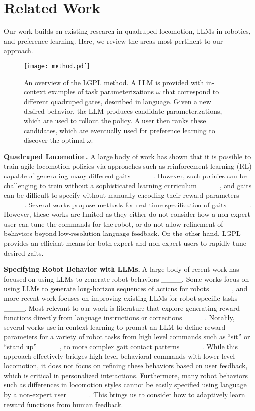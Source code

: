 \section{Related Work}
Our work builds on existing research in quadruped locomotion, LLMs in robotics, and preference learning. Here, we review the areas most pertinent to our approach.

\begin{figure*}[h]
  \centering
  \vspace{0.05in}
  \texttt{[image: method.pdf]}
  \caption{An overview of the LGPL method. A LLM is provided with in-context examples of task parameterizations $\omega$ that correspond to different quadruped gates, described in language. Given a new desired behavior, the LLM produces candidate parameterizations, which are used to rollout the policy. A user then ranks these candidates, which are eventually used for preference learning to discover the optimal $\omega$.}
  \label{fig:method}
  \vspace{-0.2in}
\end{figure*}

\noindent\textbf{Quadruped Locomotion.} A large body of work has shown that it is possible to train agile locomotion policies via approaches such as reinforcement learning (RL) capable of generating many different gaits ____. However, such policies can be challenging to train without a sophisticated learning curriculum ____, and gaits can be difficult to specify without manually encoding their reward parameters ____. Several works propose methods for real time specification of gaits ____. However, these works are limited as they either do not consider how a non-expert user can tune the commands for the robot, or do not allow refinement of behaviors beyond low-resolution language feedback. On the other hand, LGPL provides an efficient means for both expert and non-expert users to rapidly tune desired gaits.

\noindent\textbf{Specifying Robot Behavior with LLMs.} A large body of recent work has focused on using LLMs to generate robot behaviors ____. Some works focus on using LLMs to generate long-horizon sequences of actions for robots ____, and more recent work focuses on improving existing LLMs for robot-specific tasks ____. Most relevant to our work is literature that explore generating reward functions directly from language instructions or corrections ____. Notably, several works use in-context learning to prompt an LLM to define reward parameters for a variety of robot tasks from high level commands such as ``sit'' or ``stand up'' ____, to more complex gait contact patterns ____. 
While this approach effectively bridges high-level behavioral commands with lower-level locomotion, it does not focus on refining these behaviors based on user feedback, which is critical in personalized interactions. 
 Furthermore, many robot behaviors such as differences in locomotion styles cannot be easily specified using language by a non-expert user ____. This brings us to consider how to adaptively learn reward functions from human feedback.

